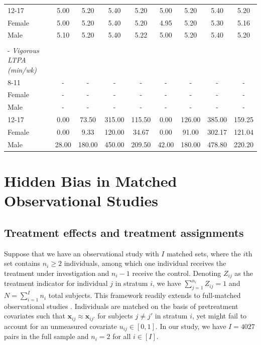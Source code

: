 \documentclass[12pt,leqno,titlepage]{amsart}
\newcommand{\1}{\mathbbm{1}}
\begin{document}
\begin{bibunit}
\begin{table}[!t]
\begin{tabular*}{\linewidth}{@{\extracolsep{\fill}}lcccc|cccc@{}}
\hspace*{2.2em}12-17 & 5.00 & 5.20 & 5.40 & 5.20 & 5.00 & 5.20 & 5.40 & 5.20 \\
\hspace*{4.4em}Female & 5.00 & 5.20 & 5.40 & 5.20 & 4.95 & 5.20 & 5.30 & 5.16 \\
\hspace*{4.4em}Male & 5.10 & 5.20 & 5.40 & 5.22 & 5.00 & 5.20 & 5.40 & 5.20 \\
\rule{0pt}{1.1em} & & & & & & & & \\
\hspace*{0.8em}- \textit{Vigorous LTPA (min/wk)} & & & & & & & & \\
\hspace*{2.2em}8-11 & - & - & - & - & - & - & - & - \\
\hspace*{4.4em}Female & - & - & - & - & - & - & - & - \\
\hspace*{4.4em}Male & - & - & - & - & - & - & - & - \\
\hspace*{2.2em}12-17 & 0.00 & 73.50 & 315.00 & 115.50 & 0.00 & 126.00 & 385.00 & 159.25 \\
\hspace*{4.4em}Female & 0.00 & 9.33 & 120.00 & 34.67 & 0.00 & 91.00 & 302.17 & 121.04 \\
\hspace*{4.4em}Male & 28.00 & 180.00 & 450.00 & 209.50 & 42.00 & 180.00 & 478.80 & 220.20 \\
\bottomrule
\end{tabular*}
\end{table}






\section{Hidden Bias in Matched Observational Studies} \label{sec: notation}

\subsection{Treatment effects and treatment assignments}

Suppose that we have an observational study with $I$ matched sets, where the $i$th set contains $n_i \geq 2$ individuals, among which one individual receives the treatment under investigation and $n_i-1$ receive the control. Denoting $Z_{ij}$ as the treatment indicator for individual $j$ in stratum $i$, we have $\sum_{j=1}^{n_i} Z_{ij} = 1$ and $N = \sum_{i=1}^{I} n_i$ total subjects. This framework readily extends to full-matched observational studies \citep{hansen2004full}. 
Individuals are matched on the basis of pretreatment covariates such that $\mathbf{x}_{ij} \approx \mathbf{x}_{ij'}$ for subjects $j \neq j'$ in stratum $i$, yet might fail to account for an unmeasured covariate $u_{ij} \in [0,1].$ In our study, we have $I = 4027$ pairs in the full sample and $n_i = 2$ for all $i \in [I].$%


\end{bibunit}
\end{document}
